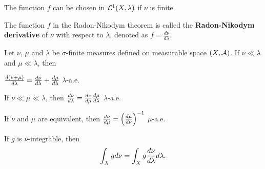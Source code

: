 \begin{remark}
    The function $f$ can be chosen in $\mathcal{L}^1(X,\lambda)$ if 
    $\nu$ is finite.
\end{remark}

\begin{definition}
    The function $f$ in the Radon-Nikodym theorem is called the 
    \textbf{Radon-Nikodym derivative} of $\nu$ with respect to $\lambda$, 
    denoted as $f = \frac{d\nu}{d\lambda}$.
\end{definition}

\begin{proposition}\label{prop:r-n_derivative}
    Let $\nu$, $\mu$ and $\lambda$ be $\sigma$-finite measures defined 
    on measurable space $(X,\mathcal{A})$. If $\nu\ll\lambda$ and $\mu\ll\lambda$, 
    then 
    \begin{thmenum}
        \item $\frac{d{(\nu+\mu)}}{d{\lambda}} = \frac{d{\nu}}{d{\lambda}} + \frac{d{\mu}}{d{\lambda}}$ 
        $\lambda$-a.e.
        \item If $\nu\ll\mu\ll\lambda$, then $\frac{d{\nu}}{d{\lambda}} 
        = \frac{d{\nu}}{d{\mu}}\frac{d{\mu}}{d{\lambda}}$ $\lambda$-a.e. 
        \item If $\nu$ and $\mu$ are equivalent, then $\od{\nu}{\mu} 
        = \pth{\od{\mu}{\nu}}^{-1}$ $\mu$-a.e. 
        \item If $g$ is $\nu$-integrable, then 
        \begin{equation*}
            \int_X gd\nu = \int_X g\frac{d{\nu}}{d{\lambda}}d\lambda.
        \end{equation*}
    \end{thmenum}
\end{proposition}
